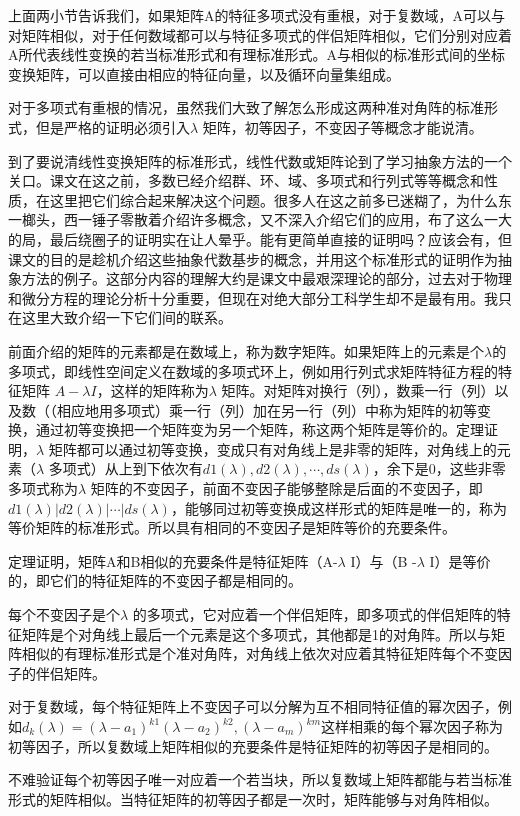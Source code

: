 	上面两小节告诉我们，如果矩阵A的特征多项式没有重根，对于复数域，A可以与对矩阵相似，对于任何数域都可以与特征多项式的伴侣矩阵相似，它们分别对应着A所代表线性变换的若当标准形式和有理标准形式。A与相似的标准形式间的坐标变换矩阵，可以直接由相应的特征向量，以及循环向量集组成。
		
	对于多项式有重根的情况，虽然我们大致了解怎么形成这两种准对角阵的标准形式，但是严格的证明必须引入$ \lambda $ 矩阵，初等因子，不变因子等概念才能说清。
		
	到了要说清线性变换矩阵的标准形式，线性代数或矩阵论到了学习抽象方法的一个关口。课文在这之前，多数已经介绍群、环、域、多项式和行列式等等概念和性质，在这里把它们综合起来解决这个问题。很多人在这之前多已迷糊了，为什么东一榔头，西一锤子零散着介绍许多概念，又不深入介绍它们的应用，布了这么一大的局，最后绕圈子的证明实在让人晕乎。能有更简单直接的证明吗？应该会有，但课文的目的是趁机介绍这些抽象代数基步的概念，并用这个标准形式的证明作为抽象方法的例子。这部分内容的理解大约是课文中最艰深理论的部分，过去对于物理和微分方程的理论分析十分重要，但现在对绝大部分工科学生却不是最有用。我只在这里大致介绍一下它们间的联系。
	
	前面介绍的矩阵的元素都是在数域上，称为数字矩阵。如果矩阵上的元素是个$ \lambda  $的多项式，即线性空间定义在数域的多项式环上，例如用行列式求矩阵特征方程的特征矩阵 $ A -\lambda I $，这样的矩阵称为$ \lambda $ 矩阵。对矩阵对换行（列），数乘一行（列）以及数（（相应地用多项式）乘一行（列）加在另一行（列）中称为矩阵的初等变换，通过初等变换把一个矩阵变为另一个矩阵，称这两个矩阵是等价的。定理证明，$ \lambda $ 矩阵都可以通过初等变换，变成只有对角线上是非零的矩阵，对角线上的元素（$ \lambda $ 多项式）从上到下依次有$ d1(\lambda ),d2(\lambda ),\cdots,ds(\lambda ) $，余下是0，这些非零多项式称为$ \lambda $ 矩阵的不变因子，前面不变因子能够整除是后面的不变因子，即$ d1(\lambda )|d2(\lambda )|\cdots|ds(\lambda ) $，能够同过初等变换成这样形式的矩阵是唯一的，称为等价矩阵的标准形式。所以具有相同的不变因子是矩阵等价的充要条件。
	
	定理证明，矩阵A和B相似的充要条件是特征矩阵（A-$\lambda$ I）与（B -$\lambda$ I）是等价的，即它们的特征矩阵的不变因子都是相同的。
	
	每个不变因子是个$\lambda$ 的多项式，它对应着一个伴侣矩阵，即多项式的伴侣矩阵的特征矩阵是个对角线上最后一个元素是这个多项式，其他都是1的对角阵。所以与矩阵相似的有理标准形式是个准对角阵，对角线上依次对应着其特征矩阵每个不变因子的伴侣矩阵。
	
	对于复数域，每个特征矩阵上不变因子可以分解为互不相同特征值的幂次因子，例如$ d_k(\lambda ) = (\lambda - a_1)^{k1} (\lambda - a_2)^{k2},(\lambda - a_m)^{km} $这样相乘的每个幂次因子称为初等因子，所以复数域上矩阵相似的充要条件是特征矩阵的初等因子是相同的。
	
	不难验证每个初等因子唯一对应着一个若当块，所以复数域上矩阵都能与若当标准形式的矩阵相似。当特征矩阵的初等因子都是一次时，矩阵能够与对角阵相似。